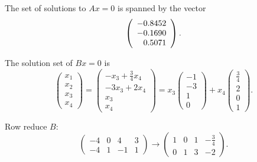 \documentclass{ximera}
\begin{document}
 The set of solutions to $Ax = 0$ is spanned by the vector
\[
\left(\begin{array}{r} -0.8452 \\ -0.1690 \\ 0.5071\end{array}\right).
\]

\ans The solution set of $Bx = 0$ is
\[
\left(\begin{array}{r} x_1 \\ x_2 \\ x_3 \\ x_4 \end{array}\right)
= \left(\begin{array}{c} -x_3 + \frac{3}{4}x_4 \\ -3x_3 + 2x_4 \\
x_3 \\ x_4 \end{array}\right) = x_3\left(\begin{array}{r} -1 \\ -3 \\
1 \\ 0 \end{array}\right) + x_4\left(\begin{array}{r} \frac{3}{4} \\
2 \\ 0 \\ 1 \end{array}\right).
\]

\soln Row reduce $B$:
\[
\left(\begin{array}{rrrr} -4 & 0 & 4 & 3 \\ -4 & 1 & -1 & 1
\end{array}\right) \longrightarrow \left(\begin{array}{rrrr}
1 & 0 & 1 & -\frac{3}{4} \\ 0 & 1 & 3 & -2 \end{array}\right).
\]
\end{document}
